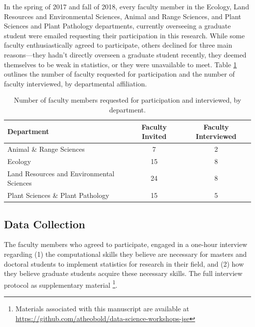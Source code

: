 \documentclass[12pt]{article}
\begin{document}
\quad In the spring of 2017 and fall of 2018, every faculty member in the
Ecology, Land Resources and Environmental Sciences, Animal and Range Sciences, 
and Plant Sciences and Plant Pathology departments, currently overseeing a
graduate student were emailed requesting their participation in this research. 
While some faculty enthusiastically agreed to participate, others declined for
three main reasons---they hadn't directly overseen a graduate student recently,
they deemed themselves to be weak in statistics, or they were unavailable to
meet. Table \ref{tab:faculty} outlines the number of faculty requested for
participation and the number of faculty interviewed, by departmental
affiliation. 

{
\begin{table}[h!]
\centering
\begin{tabular}{lcc}
\hline
Department & Faculty Invited & Faculty Interviewed  \\
\hline
Animal \& Range Sciences & 7 & 2 \\
Ecology & 15 & 8 \\
Land Resources and Environmental Sciences & 24 & 8 \\
Plant Sciences \& Plant Pathology &  15 & 5 \\ 
\hline
\end{tabular}
\caption{Number of faculty members requested for participation and interviewed,
by department.}
\label{tab:faculty}
\end{table}
}

\subsection{Data Collection}  

\quad The faculty members who agreed to participate, engaged in a one-hour 
interview regarding (1) the computational skills they believe are necessary for
masters and doctoral students to implement statistics for research in their
field, and (2) how they believe graduate students acquire these necessary
skills. The full interview protocol as supplementary material 
\footnote{Materials associated with this manuscript are available at 
\href{https://github.com/atheobold/data-science-workshops-jse}{https://github.com/atheobold/data-science-workshops-jse}}.  

\end{document}

